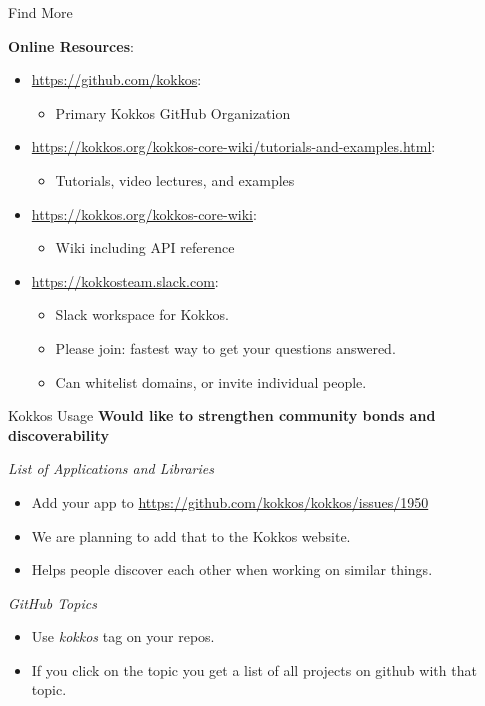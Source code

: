 \begin{frame}{Find More}

  \textbf{Online Resources}:

  \begin{itemize}
    \item \url{https://github.com/kokkos}:
          \begin{itemize}
            \item Primary Kokkos GitHub Organization
          \end{itemize}
    \item \url{https://kokkos.org/kokkos-core-wiki/tutorials-and-examples.html}:
          \begin{itemize}
            \item{Tutorials, video lectures, and examples}
          \end{itemize}
    \item \url{https://kokkos.org/kokkos-core-wiki}:
          \begin{itemize}
            \item Wiki including API reference
          \end{itemize}
    \item \url{https://kokkosteam.slack.com}:
          \begin{itemize}
            \item Slack workspace for Kokkos.
            \item Please join: fastest way to get your questions answered.
            \item Can whitelist domains, or invite individual people.
          \end{itemize}
  \end{itemize}

\end{frame}

\begin{frame}[fragile]{Kokkos Usage}
  \textbf{Would like to strengthen community bonds and discoverability}

  \vspace{10pt}
  \textit{List of Applications and Libraries}
  \begin{itemize}
    \item Add your app to \url{https://github.com/kokkos/kokkos/issues/1950}
    \item We are planning to add that to the Kokkos website.
    \item Helps people discover each other when working on similar things.
  \end{itemize}

  \vspace{10pt}
  \textit{GitHub Topics}
  \begin{itemize}
    \item Use \textit{kokkos} tag on your repos.
    \item If you click on the topic you get a list of all projects on github with that topic.
  \end{itemize}
\end{frame}

